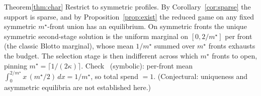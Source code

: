 \begin{myproof}{Theorem}{\ref{thm:char}}
Restrict to symmetric profiles. By Corollary~\ref{cor:sparse} the support is
sparse, and by Proposition~\ref{prop:exist} the reduced game on any fixed
symmetric $m^\star$-front union has an equilibrium. On symmetric fronts the
unique symmetric second-stage solution is the uniform marginal on
$[0,2/m^\star]$ per front (the classic Blotto marginal), whose mean
$1/m^\star$ summed over $m^\star$ fronts exhausts the budget. The selection
stage is then indifferent across which $m^\star$ fronts to open, pinning
$m^\star=\lceil 1/(2\kappa)\rceil$. Check \checkmark\ (symbolic): per-front mean
$\int_0^{2/m^\star}\!x\,(m^\star/2)\,dx = 1/m^\star$, so total spend $=1$.
(Conjectural: uniqueness and asymmetric equilibria are not established here.)
\end{myproof}
